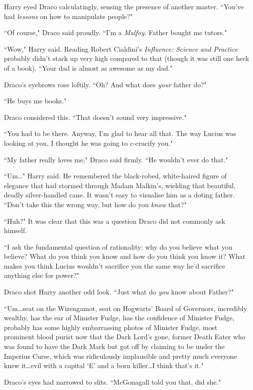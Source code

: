 Harry eyed Draco calculatingly, sensing the presence of another master. ``You've had \emph{lessons} on how to manipulate people?"

``Of course," Draco said proudly. ``I'm a \emph{Malfoy.} Father bought me tutors."

``Wow," Harry said. Reading Robert Cialdini's \emph{Influence: Science and Practice} probably didn't stack up very high compared to that (though it was still one heck of a book). ``Your dad is almost as awesome as my dad."

Draco's eyebrows rose loftily. ``Oh? And what does \emph{your} father do?"

``He buys me books."

Draco considered this. ``That doesn't sound very impressive."

``You had to be there. Anyway, I'm glad to hear all that. The way Lucius was looking at you, I thought he was going to c-crucify you."

``My father really loves me," Draco said firmly. ``He wouldn't ever do that."

``Um…" Harry said. He remembered the black-robed, white-haired figure of elegance that had stormed through Madam Malkin's, wielding that beautiful, deadly silver-handled cane. It wasn't easy to visualise him as a doting father. ``Don't take this the wrong way, but how do you \emph{know} that?"

``Huh?" It was clear that this was a question Draco did not commonly ask himself.

``I ask the fundamental question of rationality: why do you believe what you believe? What do you think you know and how do you think you know it? What makes you think Lucius wouldn't sacrifice you the same way he'd sacrifice anything else for power?"

Draco shot Harry another odd look. ``Just what do \emph{you} know about Father?"

``Um…seat on the Wizengamot, seat on Hogwarts' Board of Governors, incredibly wealthy, has the ear of Minister Fudge, has the confidence of Minister Fudge, probably has some highly embarrassing photos of Minister Fudge, most prominent blood purist now that the Dark Lord's gone, former Death Eater who was found to have the Dark Mark but got off by claiming to be under the Imperius Curse, which was ridiculously implausible and pretty much everyone knew it…evil with a capital `E' and a born killer…I think that's it."

Draco's eyes had narrowed to slits. ``McGonagall told you that, did she."

